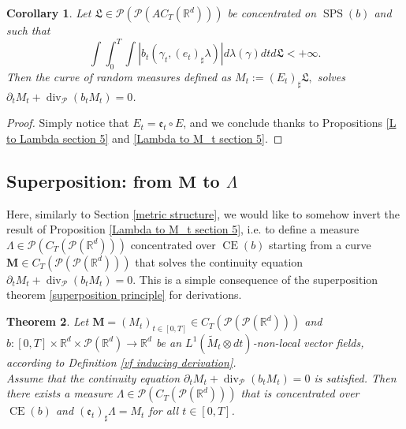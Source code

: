 \documentclass[10pt,leqno]{amsart}
\numberwithin{equation}{section}
\newtheorem{teorema}{Theorem}[section]
\newtheorem{co}[teorema]{Corollary}
\newcommand{\R}{\mathbb{R}}
\newcommand{\PP}{\mathcal{P}}
\begin{document}
\begin{co}
    Let $\mathfrak{L}\in \PP(\PP(AC_T(\R^d)))$ be concentrated on $\operatorname{SPS}(b)$ and such that 
    \[\int \int_0^T \int |b_t(\gamma_t,(e_t)_\sharp \lambda)| d\lambda(\gamma) dt d\mathfrak{L}<+\infty.\] Then the curve of random measures defined as 
    $
        M_t:= (E_t)_\sharp  \mathfrak{L}, 
    $
    solves $\partial_tM_t + \operatorname{div}_\PP(b_t M_t) = 0$.
\end{co}

\begin{proof}
    Simply notice that $E_t = \mathfrak{e}_t \circ E$, and we conclude thanks to Propositions \ref{L to Lambda section 5} and \ref{Lambda to M_t section 5}.
\end{proof}

\subsection{Superposition: from \texorpdfstring{$\boldsymbol{M}$}{} to \texorpdfstring{$\Lambda$}{}}

Here, similarly to Section \ref{metric structure}, we would like to somehow invert the result of Proposition \ref{Lambda to M_t section 5}, i.e. to define a measure $\Lambda \in \PP(C_T(\PP(\R^d)))$ concentrated over $\operatorname{CE}(b)$ starting from a curve $\boldsymbol{M} \in C_T(\PP(\PP(\R^d)))$ that solves the continuity equation $\partial_tM_t + \operatorname{div}_\PP(b_tM_t)=0$. This is a simple consequence of the superposition theorem \ref{superposition principle} for derivations.

\begin{teorema}\label{superposition principle for non-local vf}
    Let $\boldsymbol{M}=(M_t)_{t\in [0,T]} \in C_T(\PP(\PP(\R^d)))$ and $b:[0,T]\times \R^d \times \PP(\R^d) \to \R^d$ be an $L^1(\widetilde{M}_t \otimes dt)$-non-local vector fields, according to Definition \ref{vf inducing derivation}. 
    \\
    Assume that the continuity equation $\partial_tM_t + \operatorname{div}_\PP(b_tM_t) = 0$ is satisfied. 
    Then there exists a measure $\Lambda \in \PP(C_T(\PP(\R^d)))$ that is concentrated over $\operatorname{CE}(b)$ and $(\mathfrak{e}_t)_\sharp \Lambda = M_t$ for all $t\in [0,T]$.
\end{teorema}
\end{document}
